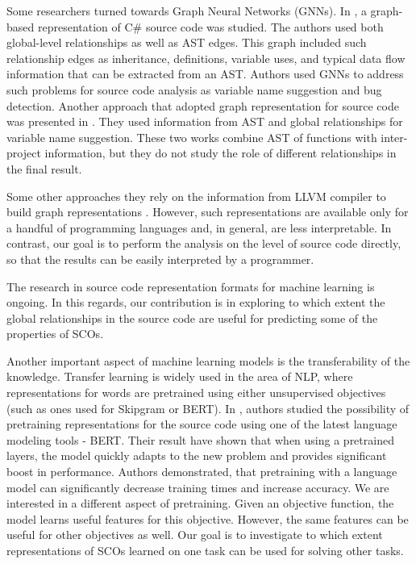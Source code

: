 \documentclass[a4paper,twoside]{article}
\begin{document}
Some researchers turned towards Graph Neural Networks (GNNs). In \cite{Allamanis2017}, a graph-based representation of C\# source code was studied. The authors used both global-level relationships as well as AST edges. This graph included such relationship edges as inheritance, definitions, variable uses, and typical data flow information that can be extracted from an AST. Authors used GNNs to address such problems for source code analysis as variable name suggestion and bug detection. 
Another approach that adopted graph representation for source code was presented in \cite{Cvitkovic2018}. They used information from AST and global relationships for variable name suggestion. These two works combine AST of functions with inter-project information, but they do not study the role of different relationships in the final result. 

Some other approaches they rely on the information from LLVM compiler to build graph representations \cite{Ben-Nun2018} \cite{Brauckmann2020}. However, such representations are available only for a handful of programming languages and, in general, are less interpretable. In contrast, our goal is to perform the analysis on the level of source code directly, so that the results can be easily interpreted by a programmer. 

The research in source code representation formats for machine learning is ongoing. In this regards, our contribution is in exploring to which extent the global relationships in the source code are useful for predicting some of the properties of SCOs.

Another important aspect of machine learning models is the transferability of the knowledge. Transfer learning is widely used in the area of NLP, where representations for words are pretrained using either unsupervised objectives (such as ones used for Skipgram or BERT).
In \cite{Kanade2019}, authors studied the possibility of pretraining representations for the source code using one of the latest language modeling tools - BERT. Their result have shown that when using a pretrained layers, the model quickly adapts to the new problem and provides significant boost in performance. Authors demonstrated, that pretraining with a language model can significantly decrease training times and increase accuracy. We are interested in a different aspect of pretraining. Given an objective function, the model learns useful features for this objective. However, the same features can be useful for other objectives as well. Our goal is to investigate to which extent representations of SCOs learned on one task can be used for solving other tasks.
\end{document}
